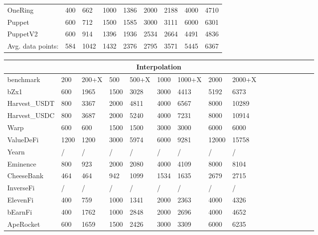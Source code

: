 \begin{table}[thbp]
\begin{tabular}{|l|llllllll|}
        OneRing           & 400  & 662   & 1000 & 1386  & 2000 & 2188   & 4000  & 4710    \\
        Puppet            & 600  & 712   & 1500 & 1585  & 3000 & 3111   & 6000  & 6301    \\
        PuppetV2          & 600  & 914   & 1396 & 1936  & 2534 & 2664   & 4491  & 4836    \\ \hline
        Avg. data points: & 584  & 1042  & 1432 & 2376  & 2795 & 3571   & 5445  & 6367    \\ \hline
    \end{tabular}
    \linebreak
    \begin{tabular}{|l|llllllll|llllllll|}
        \hline

                          &      \multicolumn{8}{c|}{Interpolation}                         \\ \hline
        benchmark         & 200  & 200+X & 500  & 500+X & 1000 & 1000+X & 2000  & 2000+X \\ \hline
        bZx1              & 600  & 1965  & 1500 & 3028  & 3000 & 4413   & 5192  & 6373   \\
        Harvest\_USDT     & 800  & 3367  & 2000 & 4811  & 4000 & 6567   & 8000  & 10289  \\
        Harvest\_USDC     & 800  & 3687  & 2000 & 5240  & 4000 & 7231   & 8000  & 10914  \\
        Warp              & 600  & 600   & 1500 & 1500  & 3000 & 3000   & 6000  & 6000   \\
        ValueDeFi         & 1200 & 1200  & 3000 & 5974  & 6000 & 9281   & 12000 & 15758  \\
        Yearn             & /    & /     & /    & /     & /    & /      & /     & /      \\
        Eminence          & 800  & 923   & 2000 & 2080  & 4000 & 4109   & 8000  & 8104   \\
        CheeseBank        & 464  & 464   & 942  & 1099  & 1534 & 1635   & 2679  & 2715   \\
        InverseFi         & /    & /     & /    & /     & /    & /      & /     & /      \\
        ElevenFi          & 400  & 759   & 1000 & 1341  & 2000 & 2363   & 4000  & 4326   \\
        bEarnFi           & 400  & 1762  & 1000 & 2848  & 2000 & 2696   & 4000  & 4652   \\
        ApeRocket         & 600  & 1659  & 1500 & 2426  & 3000 & 3309   & 6000  & 6235   \\

\end{tabular}
\end{table}
